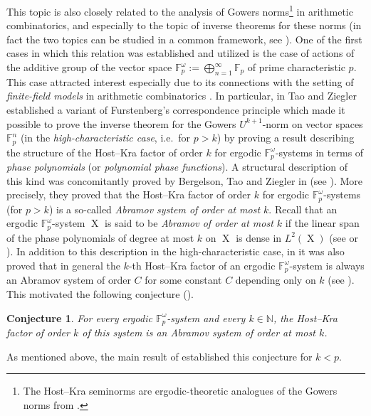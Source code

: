 \documentclass[a4paper,12pt,reqno]{amsart}
\newtheorem{conjecture}[theorem]{Conjecture}
\theoremstyle{definition}
\newcommand{\mb}{\mathbb}
\DeclareMathOperator{\ns}{X}
\begin{document}
This topic is also closely related to the analysis of Gowers norms\footnote{The Host--Kra seminorms are ergodic-theoretic analogues of the Gowers norms from \cite{GSz}.}  in arithmetic combinatorics, and especially to the topic of inverse theorems for these norms (in fact the two topics can be studied in a common framework, see \cite{CScouplings}). One of the first cases in which this relation was established and utilized is the case of actions of the additive group of the vector space $\mb{F}_p^\omega:=\bigoplus_{n=1}^\infty \mb{F}_p$ of prime characteristic $p$. This case attracted interest especially due to its connections with the setting of \emph{finite-field models} in arithmetic combinatorics \cite{Wolfsurvey}. In particular, in \cite{TZ-High} Tao and Ziegler established a variant of Furstenberg's correspondence principle which made it possible to prove the inverse theorem for the Gowers $U^{k+1}$-norm on vector spaces $\mb{F}_p^n$ (in the \emph{high-characteristic case}, i.e.\ for  $p>k$) by proving a result describing the structure of the Host--Kra factor of order $k$ for ergodic $\mb{F}_p^\omega$-systems in terms of \emph{phase polynomials} (or \emph{polynomial phase functions}). A structural description of this kind was concomitantly proved by Bergelson, Tao and Ziegler in \cite{BTZ} (see \cite[Theorem 1.19]{BTZ}). More precisely, they proved that the Host--Kra factor of order $k$ for ergodic $\mb{F}_p^\omega$-systems (for $p>k$) is a so-called \emph{Abramov system of order at most $k$}. Recall that an ergodic $\mb{F}_p^\omega$-system $\ns$ is said to be \emph{Abramov of order at most $k$} if the linear span of the phase polynomials of degree at most $k$ on $\ns$ is dense in $L^2(\ns)$ (see \cite{BTZ} or \cite[\S 5.2]{CGSS-p-hom}). In addition to this description in the high-characteristic case, in \cite{BTZ} it was also proved that in general the $k$-th Host--Kra factor of an ergodic $\mb{F}_p^\omega$-system is always an Abramov system of order $C$ for some constant $C$ depending only on $k$ (see \cite[Theorem 1.20]{BTZ}). This motivated the following conjecture (\cite[Remark 1.21]{BTZ}).

\begin{conjecture}\label{conj:BTZ}
For every ergodic $\mb{F}_p^\omega$-system and every $k\in \mb{N}$, the Host--Kra factor of order $k$ of this system is an Abramov system of order at most $k$.
\end{conjecture}
\noindent As mentioned above, the main result of \cite{BTZ}  established this conjecture for $k<p$. 
\end{document}
